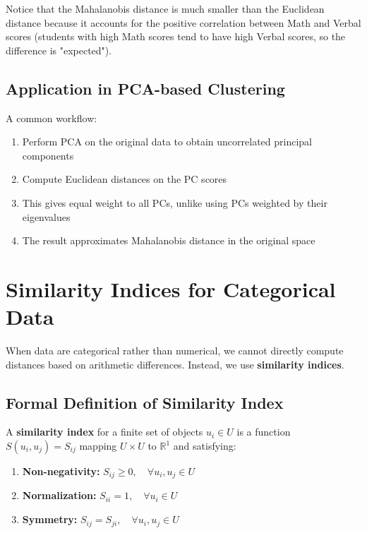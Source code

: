 \documentclass[11pt]{article}
\begin{document}
Notice that the Mahalanobis distance is much smaller than the Euclidean distance because it accounts for the positive correlation between Math and Verbal scores (students with high Math scores tend to have high Verbal scores, so the difference is "expected").

\subsection{Application in PCA-based Clustering}

A common workflow:
\begin{enumerate}
    \item Perform PCA on the original data to obtain uncorrelated principal components
    \item Compute Euclidean distances on the PC scores
    \item This gives equal weight to all PCs, unlike using PCs weighted by their eigenvalues
    \item The result approximates Mahalanobis distance in the original space
\end{enumerate}

\section{Similarity Indices for Categorical Data}

When data are categorical rather than numerical, we cannot directly compute distances based on arithmetic differences. Instead, we use \textbf{similarity indices}.

\subsection{Formal Definition of Similarity Index}

A \textbf{similarity index} for a finite set of objects $u_i \in U$ is a function $S(u_i, u_j) = S_{ij}$ mapping $U \times U$ to $\mathbb{R}^1$ and satisfying:

\begin{enumerate}
    \item \textbf{Non-negativity:} $S_{ij} \geq 0, \quad \forall u_i, u_j \in U$
    \item \textbf{Normalization:} $S_{ii} = 1, \quad \forall u_i \in U$
    \item \textbf{Symmetry:} $S_{ij} = S_{ji}, \quad \forall u_i, u_j \in U$
\end{enumerate}
\end{document}

